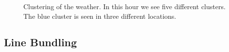 \documentclass[journal]{vgtc}                %
\begin{document}
\begin{figure}[htp]
  \centering
  \quad
  \quad
\caption{Clustering of the weather. In this hour we see five different clusters. The blue cluster is seen in three different locations.}
\label{fig:clusters}
\end{figure}

\subsection{Line Bundling}
\end{document}
